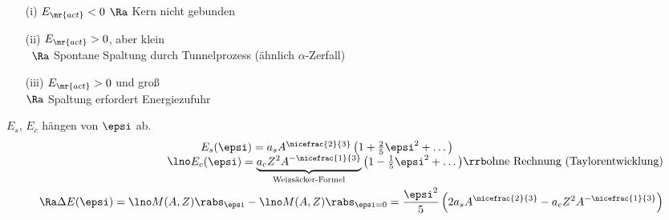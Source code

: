 \begin{itemize}
\item[(i)] $E_\mr{act} < 0$ $\Ra$ Kern nicht gebunden
\item[(ii)] $E_\mr{act} > 0$, aber klein\\\
$\Ra$ Spontane Spaltung durch Tunnelprozess (ähnlich $\alpha$-Zerfall)
\item[(iii)] $E_\mr{act} > 0$ und groß\\
$\Ra$ Spaltung erfordert Energiezufuhr
\end{itemize}
$E_s$, $E_c$ hängen von $\epsi$ ab.
\begin{align*}
\lno \begin{matrix}
E_s (\epsi) = a_s A^{\nicefrac{2}{3}} \left( 1+ \frac{2}{5}\epsi^2 + \dots \right) \\ E_c(\epsi) = \underbrace{a_c Z^2 A^{-\nicefrac{1}{3}}}_\text{Weizsäcker-Formel} \left( 1 - \frac{1}{5} \epsi^2 + \dots \right)
\end{matrix} \rrb \text{ohne Rechnung (Taylorentwicklung)}\\
\Ra \Delta E (\epsi) =\lno M(A,Z) \rabs_\epsi - \lno M(A,Z) \rabs_{\epsi=0} = \frac{\epsi^2}{5} \left( 2 a_s A^{\nicefrac{2}{3}} - a_c Z^2 A^{-\nicefrac{1}{3}}\right)
\end{align*}
